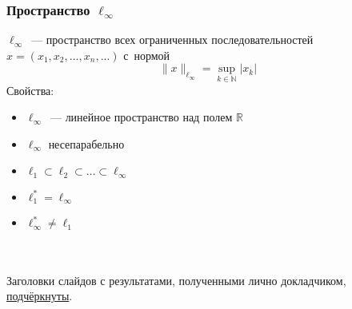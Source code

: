 
\begin{frame}\frametitle{Пространство $\ell_\infty$}
	$\ell_\infty$~--- пространство всех ограниченных последовательностей
	$x=(x_1, x_2, ..., x_n, ...)$
	с~нормой
	$$
		\|x\|_{\ell_\infty} = \sup_{k\in\mathbb{N}} |x_k|
	$$
	{Свойства:}

	\begin{itemize}
		\item
			$\ell_\infty$~--- линейное пространство над полем $\mathbb{R}$
		\item
			$\ell_\infty$  несепарабельно
		\item
			$\ell_1 \subset \ell_2 \subset \dots \subset \ell_\infty$
		\item
			$\ell_1^* = \ell_\infty$
		\item
			$\ell_\infty^* \neq \ell_1$
	\end{itemize}

	\vfill
	~\\~\\
	Заголовки слайдов с результатами, полученными лично докладчиком, \underline{подчёркнуты}.
\end{frame}



